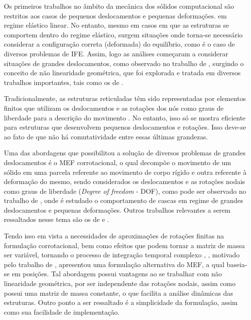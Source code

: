 Os primeiros trabalhos no âmbito da mecânica dos sólidos computacional são restritos aos casos de pequenos deslocamentos e pequenas deformações. em regime elástico linear. No entanto, mesmo em casos em que as estruturas se comportem dentro do regime elástico, surgem situações onde torna-se necessário considerar a configuração correta (deformada) do equilíbrio, como é o caso de diversos problemas de IFE. Assim, logo as análises começaram a considerar situações de grandes deslocamentos, como observado no trabalho de , surgindo o conceito de não linearidade geométrica, que foi explorada e tratada em diversos trabalhos importantes, tais como os de .

Tradicionalmente, as estruturas reticuladas têm sido representadas por elementos finitos que utilizam os deslocamentos e as rotações dos nós como graus de liberdade para a descrição do movimento \cite{reddy2005introduction,assan2020metodo}. No entanto, isso só se mostra eficiente para estruturas que desenvolvem pequenos deslocamentos e rotações. Isso deve-se ao fato de que não há comutatividade entre essas últimas grandezas.

Uma das abordagens que possibilitou a solução de diversos problemas de grandes deslocamentos é o MEF corrotacional, o qual decompõe o movimento de um sólido em uma parcela referente ao movimento de corpo rígido e outra referente à deformação do mesmo, sendo considerados os deslocamentos e as rotações nodais como graus de liberdade (\textit{Degree of freedom} - DOF), como pode ser observado no trabalho de , onde é estudado o comportamento de cascas em regime de grandes deslocamentos e pequenas deformações. Outros trabalhos relevantes a serem ressaltados nesse tema são os de  e .

Tendo isso em vista a necessidades de aproximações de rotações finitas na formulação corrotacional, bem como efeitos que podem tornar a matriz de massa ser variável, tornando o processo de integração temporal complexo \cite{sanches2013unconstrained}, , motivado pelo trabalho de , apresentou uma formulação alternativa do MEF, a qual baseia-se em posições. Tal abordagem possui vantagens ao se trabalhar com não linearidade geométrica, por ser independente das rotações nodais, assim como possui uma matriz de massa constante, o que facilita a análise dinâmicas das estruturas. Outro ponto a ser ressaltado é a simplicidade da formulação, assim como sua facilidade de implementação.


